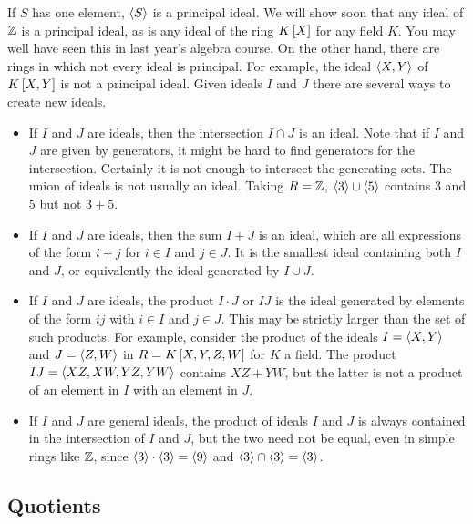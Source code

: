 If $ S $ has one element, $ \left\langle S \right\rangle $ is a principal ideal. We will show soon that any ideal of $ \mathbb{Z} $ is a principal ideal, as is any ideal of the ring $ K\sbr{X} $ for any field $ K $. You may well have seen this in last year's
algebra course. On the other hand, there are rings in which not every ideal is principal. For example, the ideal $ \left\langle X, Y \right\rangle $ of $ K\sbr{X, Y} $ is not a principal ideal. Given ideals $ I $ and $ J $ there are several ways to create new ideals.

\begin{example*}
\hfill
\begin{itemize}
\item If $ I $ and $ J $ are ideals, then the intersection $ I \cap J $ is an ideal. Note that if $ I $ and $ J $ are given by generators, it might be hard to find generators for the intersection. Certainly it is not enough to intersect the generating sets. The union of ideals is not usually an ideal. Taking $ R = \mathbb{Z} $, $ \left\langle 3 \right\rangle \cup \left\langle 5 \right\rangle $ contains $ 3 $ and $ 5 $ but not $ 3 + 5 $.
\item If $ I $ and $ J $ are ideals, then the sum $ I + J $ is an ideal, which are all expressions of the form $ i + j $ for $ i \in I $ and $ j \in J $. It is the smallest ideal containing both $ I $ and $ J $, or equivalently the ideal generated by $ I \cup J $.
\item If $ I $ and $ J $ are ideals, the product $ I \cdot J $ or $ IJ $ is the ideal generated by elements of the form $ ij $ with $ i \in I $ and $ j \in J $. This may be strictly larger than the set of such products. For example, consider the product of the ideals $ I = \left\langle X, Y \right\rangle $ and $ J = \left\langle Z, W \right\rangle $ in $ R = K\sbr{X, Y, Z, W} $ for $ K $ a field. The product $ IJ = \left\langle XZ, XW, YZ, YW \right\rangle $ contains $ XZ + YW $, but the latter is not a product of an element in $ I $ with an element in $ J $.
\item If $ I $ and $ J $ are general ideals, the product of ideals $ I $ and $ J $ is always contained in the intersection of $ I $ and $ J $, but the two need not be equal, even in simple rings like $ \mathbb{Z} $, since $ \left\langle 3 \right\rangle \cdot \left\langle 3 \right\rangle = \left\langle 9 \right\rangle $ and $ \left\langle 3 \right\rangle \cap \left\langle 3 \right\rangle = \left\langle 3 \right\rangle $.
\end{itemize}
\end{example*}

\subsection{Quotients}

